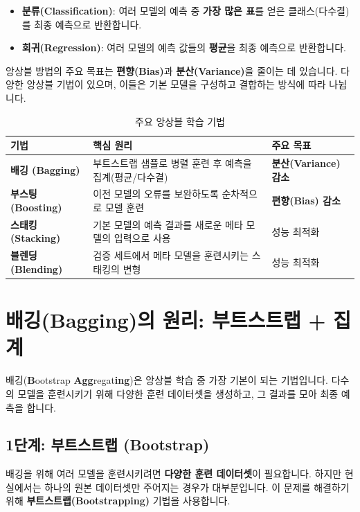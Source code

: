 \documentclass[11pt,a4paper]{book}
\theoremstyle{definition}
\begin{document}
\begin{itemize}
    \item \textbf{분류(Classification)}: 여러 모델의 예측 중 \textbf{가장 많은 표}를 얻은 클래스(다수결)를 최종 예측으로 반환합니다.
    \item \textbf{회귀(Regression)}: 여러 모델의 예측 값들의 \textbf{평균}을 최종 예측으로 반환합니다.
\end{itemize}

앙상블 방법의 주요 목표는 \textbf{편향(Bias)}과 \textbf{분산(Variance)}을 줄이는 데 있습니다. 다양한 앙상블 기법이 있으며, 이들은 기본 모델을 구성하고 결합하는 방식에 따라 나뉩니다.

\begin{table}[h!]
\centering
\caption{주요 앙상블 학습 기법}
\label{tab:ensemble_methods}
\begin{tabular}{lll}
\toprule
\textbf{기법} & \textbf{핵심 원리} & \textbf{주요 목표} \\
\midrule
\textbf{배깅 (Bagging)} & 부트스트랩 샘플로 병렬 훈련 후 예측을 집계(평균/다수결) & \textbf{분산(Variance) 감소} \\
\textbf{부스팅 (Boosting)} & 이전 모델의 오류를 보완하도록 순차적으로 모델 훈련 & \textbf{편향(Bias) 감소} \\
\textbf{스태킹 (Stacking)} & 기본 모델의 예측 결과를 새로운 메타 모델의 입력으로 사용 & 성능 최적화 \\
\textbf{블렌딩 (Blending)} & 검증 세트에서 메타 모델을 훈련시키는 스태킹의 변형 & 성능 최적화 \\
\bottomrule
\end{tabular}
\end{table}


\section{배깅(Bagging)의 원리: 부트스트랩 + 집계}
\label{sec:bagging_principle}

배깅(\textbf{B}ootstrap \textbf{Agg}regat\textbf{ing})은 앙상블 학습 중 가장 기본이 되는 기법입니다. 다수의 모델을 훈련시키기 위해 다양한 훈련 데이터셋을 생성하고, 그 결과를 모아 최종 예측을 합니다.

\subsection{1단계: 부트스트랩 (Bootstrap)}

배깅을 위해 여러 모델을 훈련시키려면 \textbf{다양한 훈련 데이터셋}이 필요합니다. 하지만 현실에서는 하나의 원본 데이터셋만 주어지는 경우가 대부분입니다. 이 문제를 해결하기 위해 \textbf{부트스트랩(Bootstrapping)} 기법을 사용합니다.
\end{document}

